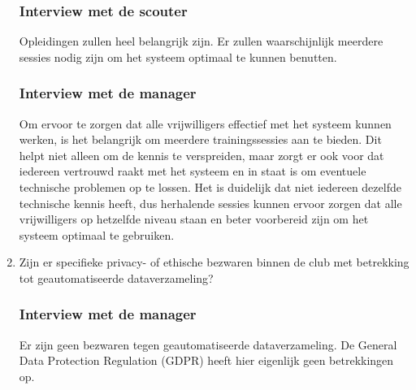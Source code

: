 \begin{enumerate}
  \subsubsection{Interview met de scouter}
  Opleidingen zullen heel belangrijk zijn. Er zullen waarschijnlijk meerdere sessies nodig zijn om het systeem optimaal te kunnen benutten.
  \subsubsection{Interview met de manager}
  Om ervoor te zorgen dat alle vrijwilligers effectief met het systeem kunnen werken, is het belangrijk om meerdere trainingssessies aan te bieden. Dit helpt niet alleen om de kennis te verspreiden, maar zorgt er ook voor dat iedereen vertrouwd raakt met het systeem en in staat is om eventuele technische problemen op te lossen. Het is duidelijk dat niet iedereen dezelfde technische kennis heeft, dus herhalende sessies kunnen ervoor zorgen dat alle vrijwilligers op hetzelfde niveau staan en beter voorbereid zijn om het systeem optimaal te gebruiken.
  \item Zijn er specifieke privacy- of ethische bezwaren binnen de club met betrekking tot geautomatiseerde dataverzameling?
  \subsubsection{Interview met de manager}
  Er zijn geen bezwaren tegen geautomatiseerde dataverzameling. De General Data Protection Regulation (GDPR) heeft hier eigenlijk geen betrekkingen op.
\end{enumerate}

